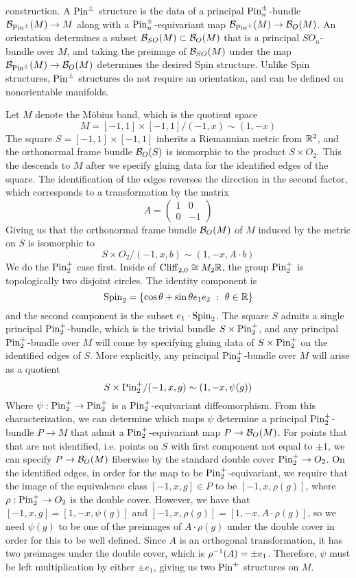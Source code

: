 construction. A $\mathrm{Pin}^\pm$ structure is the data of a principal
$\mathrm{Pin}^\pm_n$-bundle $\mathcal{B}_{\mathrm{Pin}^\pm}(M) \to M$ along with a
$\mathrm{Pin}^\pm_n$-equivariant map $\mathcal{B}_{\mathrm{Pin}^\pm}(M) \to \mathcal{B}_O(M)$. An orientation
determines a subset $\mathcal{B}_{SO}(M) \subset \mathcal{B}_O(M)$ that is a principal
$SO_n$-bundle over $M$, and taking the preimage of $\mathcal{B}_{SO}(M)$ under the
map $\mathcal{B}_{\mathrm{Pin}^\pm}(M) \to \mathcal{B}_O(M)$ determines the desired Spin structure.
%
Unlike Spin structures, $\mathrm{Pin}^\pm$ structures do not require an orientation,
and can be defined on nonorientable manifolds.
%
\begin{exmp}
Let $M$ denote the M\"obius band, which is the quotient space
\[
M = [-1,1] \times [-1,1] / (-1, x) \sim (1, -x)
\]
The square $S = [-1,1] \times [-1,1]$ inherits a Riemannian metric from $\mathbb{R}^2$,
and the orthonormal frame bundle $\mathcal{B}_O(S)$ is isomorphic to
the product $S \times O_2$. This the descends to $M$ after
we specify gluing data for the identified edges of the square. The identification
of the edges reverses the direction in the second factor, which corresponds to
a transformation by the matrix
\[
A = \begin{pmatrix}
1 & 0 \\
0 & -1
\end{pmatrix}
\]
Giving us that the orthonormal frame bundle $\mathcal{B}_O(M)$ of $M$ induced by the
metric on $S$ is isomorphic to
\[
S\times O_2 / (-1,x, b) \sim (1,-x, A \cdot b)
\]
We do the $\mathrm{Pin}^+_2$ case first. Inside of $\operatorname{Cliff}_{2,0} \cong M_2\mathbb{R}$,
the group $\mathrm{Pin}_2^+$ is topologically two disjoint circles. The identity component
is \[
\mathrm{Spin}_2 = \left\lbrace \cos\theta + \sin\theta e_1e_2 ~:~ \theta \in \mathbb{R} \right\rbrace
\]
and the second component is the subset $e_1 \cdot \mathrm{Spin}_2$. The square
$S$ admits a single principal $\mathrm{Pin}_2^+$-bundle, which is the trivial bundle
$S \times \mathrm{Pin}_2^+$, and any principal $\mathrm{Pin}_2^+$-bundle over $M$ will come
by specifying gluing data of $S \times \mathrm{Pin}_2^+$ on the identified edges of $S$.
More explicitly, any principal $\mathrm{Pin}_2^+$-bundle over $M$ will arise as a
quotient
\[
S \times \mathrm{Pin}_2^+ / (-1,x,g) \sim (1, -x, \psi(g))
\]
Where $\psi : \mathrm{Pin}_2^+ \to \mathrm{Pin}_2^+$ is a $\mathrm{Pin}_2^+$-equivariant diffeomorphism.
From this characterization, we can determine which maps $\psi$ determine
a principal $\mathrm{Pin}^+_2$-bundle $P \to M$ that admit a $\mathrm{Pin}_2^+$-equivariant
map $P \to \mathcal{B}_O(M)$. For points that that are not identified, i.e. points
on $S$ with first component not equal to $\pm 1$, we can specify
$P \to \mathcal{B}_O(M)$ fiberwise by the standard double cover $\mathrm{Pin}_2^+ \to O_2$. On
the identified edges, in order for the map to be $\mathrm{Pin}_2^+$-equivariant, we
require that the image of the equivalence class $[-1,x,g] \in P$ to be
$[-1, x, \rho(g)]$, where $\rho : \mathrm{Pin}_2^+ \to O_2$ is the double cover. However,
we have that $[-1,x,g] = [1, -x, \psi(g)]$ and
$[-1,x,\rho(g)] = [1,-x, A \cdot \rho(g)]$, so we need $\psi(g)$ to be one
of the preimages of $A \cdot \rho(g)$ under the double cover in order for this
to be well defined. Since $A$ is an orthogonal transformation, it has two
preimages under the double cover, which is $\rho^{-1}(A) = \pm e_1$. Therefore,
$\psi$ must be left multiplication by either $\pm e_1$, giving us two
$\mathrm{Pin}^+$ structures on $M$.
\end{exmp}
%